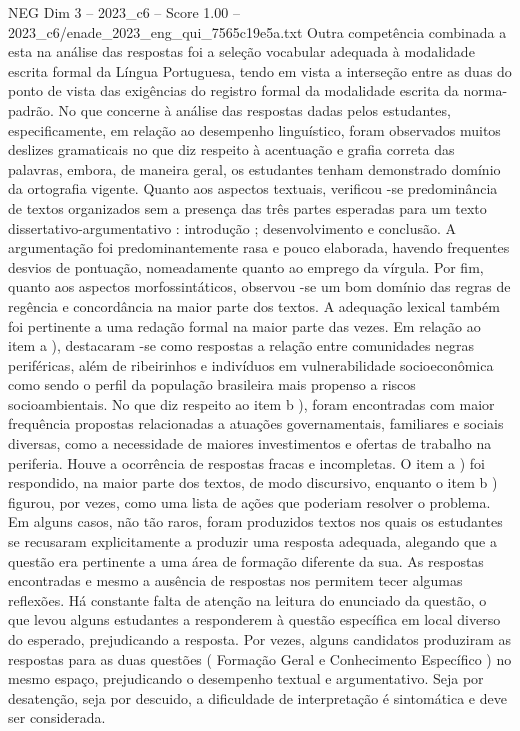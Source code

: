 \begin{textsample}{NEG Dim 3 – 2023\_c6 – Score 1.00 – 2023\_c6/enade\_2023\_eng\_qui\_7565c19e5a.txt}
Outra competência combinada a esta na análise das respostas foi a seleção vocabular adequada à modalidade escrita formal da Língua Portuguesa, tendo em vista a interseção entre as duas do ponto de vista das exigências do registro formal da modalidade escrita da norma-padrão.
No que concerne à análise das respostas dadas pelos estudantes, especificamente, em relação ao desempenho linguístico, foram observados muitos deslizes gramaticais no que diz respeito à acentuação e grafia correta das palavras, embora, de maneira geral, os estudantes tenham demonstrado domínio da ortografia vigente.
Quanto aos aspectos textuais, verificou -se predominância de textos organizados sem a presença das três partes esperadas para um texto dissertativo-argumentativo : introdução ; desenvolvimento e conclusão.
A argumentação foi predominantemente rasa e pouco elaborada, havendo frequentes desvios de pontuação, nomeadamente quanto ao emprego da vírgula.
Por fim, quanto aos aspectos morfossintáticos, observou -se um bom domínio das regras de regência e concordância na maior parte dos textos.
A adequação lexical também foi pertinente a uma redação formal na maior parte das vezes.
Em relação ao item a ), destacaram -se como respostas a relação entre comunidades negras periféricas, além de ribeirinhos e indivíduos em vulnerabilidade socioeconômica como sendo o perfil da população brasileira mais propenso a riscos socioambientais.
No que diz respeito ao item b ), foram encontradas com maior frequência propostas relacionadas a atuações governamentais, familiares e sociais diversas, como a necessidade de maiores investimentos e ofertas de trabalho na periferia.
Houve a ocorrência de respostas fracas e incompletas.
O item a ) foi respondido, na maior parte dos textos, de modo discursivo, enquanto o item b ) figurou, por vezes, como uma lista de ações que poderiam resolver o problema.
Em alguns casos, não tão raros, foram produzidos textos nos quais os estudantes se recusaram explicitamente a produzir uma resposta adequada, alegando que a questão era pertinente a uma área de formação diferente da sua.
As respostas encontradas e mesmo a ausência de respostas nos permitem tecer algumas reflexões.
Há constante falta de atenção na leitura do enunciado da questão, o que levou alguns estudantes a responderem à questão específica em local diverso do esperado, prejudicando a resposta.
Por vezes, alguns candidatos produziram as respostas para as duas questões ( Formação Geral e Conhecimento Específico ) no mesmo espaço, prejudicando o desempenho textual e argumentativo.
Seja por desatenção, seja por descuido, a dificuldade de interpretação é sintomática e deve ser considerada.

\end{textsample}
